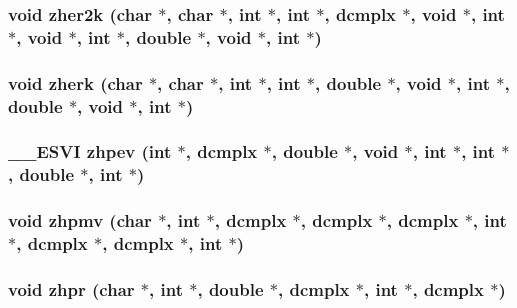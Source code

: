 \subsubsection{\setlength{\rightskip}{0pt plus 5cm}void zher2k (char $\ast$, char $\ast$, int $\ast$, int $\ast$, {\bf dcmplx} $\ast$, void $\ast$, int $\ast$, void $\ast$, int $\ast$, double $\ast$, void $\ast$, int $\ast$)}\label{essl_8h_bf4bc2ce2fa93e468e03737b0047ee95}


\subsubsection{\setlength{\rightskip}{0pt plus 5cm}void zherk (char $\ast$, char $\ast$, int $\ast$, int $\ast$, double $\ast$, void $\ast$, int $\ast$, double $\ast$, void $\ast$, int $\ast$)}\label{essl_8h_c13a258755dd153d7bab940dc97ee350}


\subsubsection{\setlength{\rightskip}{0pt plus 5cm}\_\-\_\-ESVI zhpev (int $\ast$, {\bf dcmplx} $\ast$, double $\ast$, void $\ast$, int $\ast$, int $\ast$, double $\ast$, int $\ast$)}\label{essl_8h_0f0bd617c88592f4b2828cce8390c796}


\subsubsection{\setlength{\rightskip}{0pt plus 5cm}void zhpmv (char $\ast$, int $\ast$, {\bf dcmplx} $\ast$, {\bf dcmplx} $\ast$, {\bf dcmplx} $\ast$, int $\ast$, {\bf dcmplx} $\ast$, {\bf dcmplx} $\ast$, int $\ast$)}\label{essl_8h_0f899ef921a246fc69cfde6b1c99d485}


\subsubsection{\setlength{\rightskip}{0pt plus 5cm}void zhpr (char $\ast$, int $\ast$, double $\ast$, {\bf dcmplx} $\ast$, int $\ast$, {\bf dcmplx} $\ast$)}\label{essl_8h_3b2522bd4ac2421b8063729146b551c8}


